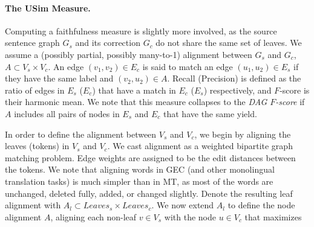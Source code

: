 \documentclass[a4paper, 11pt]{article}
\begin{document}
\paragraph{The {\sc USim} Measure.} Computing a faithfulness
measure is slightly more involved, as the source sentence graph $G_s$ and its
correction $G_c$ do not share the same set of leaves.
%
%
We assume a (possibly partial, possibly many-to-1) alignment between $G_s$ and $G_c$,
$A \subset V_s \times V_c$. An edge $(v_1,v_2) \in E_c$ is said to match an edge
$(u_1,u_2) \in E_s$ if they have the same label and $(v_2,u_2) \in A$. Recall (Precision)
is defined as the ratio of edges in $E_s$ ($E_c$) that have a match in $E_c$ ($E_s$) respectively, and
$F$-score is their harmonic mean. We note that this measure collapses to the
{\it DAG $F$-score} if $A$ includes all pairs of nodes in $E_s$ and $E_c$ that have
the same yield.

In order to define the alignment between $V_s$ and $V_c$, we begin by aligning the leaves
(tokens) in $V_s$ and $V_c$.
We cast alignment as a weighted bipartite graph matching problem. Edge weights are assigned to be the edit distances between the tokens.
We note that aligning words in GEC (and other monolingual translation tasks) is much simpler than in MT,
as most of the words are unchanged, deleted fully, added, or changed slightly.
Denote the resulting leaf alignment with $A_l \subset Leaves_s \times Leaves_c$.
We now extend $A_l$ to define the node alignment $A$, aligning each non-leaf $v \in V_s$
with the node $u \in V_c$ that maximizes
\end{document}
